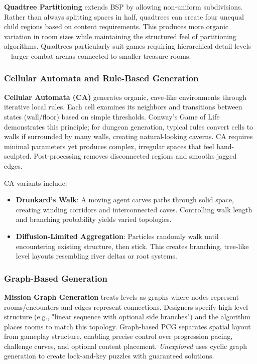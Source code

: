 \documentclass[11pt]{article}
\begin{document}
\textbf{Quadtree Partitioning} extends BSP by allowing non-uniform subdivisions. Rather than always splitting spaces in half, quadtrees can create four unequal child regions based on content requirements. This produces more organic variation in room sizes while maintaining the structured feel of partitioning algorithms. Quadtrees particularly suit games requiring hierarchical detail levels—larger combat arenas connected to smaller treasure rooms.

\subsubsection{Cellular Automata and Rule-Based Generation}

\textbf{Cellular Automata (CA)} generates organic, cave-like environments through iterative local rules. Each cell examines its neighbors and transitions between states (wall/floor) based on simple thresholds. Conway's Game of Life demonstrates this principle; for dungeon generation, typical rules convert cells to walls if surrounded by many walls, creating natural-looking caverns. CA requires minimal parameters yet produces complex, irregular spaces that feel hand-sculpted. Post-processing removes disconnected regions and smooths jagged edges.

CA variants include:
\begin{itemize}
    \item \textbf{Drunkard's Walk}: A moving agent carves paths through solid space, creating winding corridors and interconnected caves. Controlling walk length and branching probability yields varied topologies.
    \item \textbf{Diffusion-Limited Aggregation}: Particles randomly walk until encountering existing structure, then stick. This creates branching, tree-like level layouts resembling river deltas or root systems.
\end{itemize}

\subsubsection{Graph-Based Generation}

\textbf{Mission Graph Generation} treats levels as graphs where nodes represent rooms/encounters and edges represent connections. Designers specify high-level structure (e.g., "linear sequence with optional side branches") and the algorithm places rooms to match this topology. Graph-based PCG separates spatial layout from gameplay structure, enabling precise control over progression pacing, challenge curves, and optional content placement. \textit{Unexplored} uses cyclic graph generation to create lock-and-key puzzles with guaranteed solutions.
\end{document}
